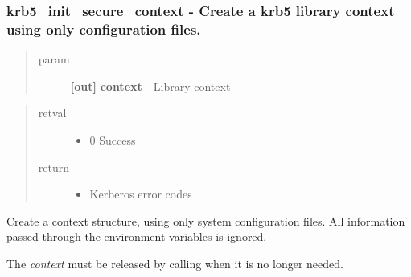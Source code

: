 \documentclass[letterpaper,10pt,english]{sphinxmanual}
\begin{document}
\subsubsection{krb5\_init\_secure\_context -  Create a krb5 library context using only configuration files.}
\label{appdev/refs/api/krb5_init_secure_context::doc}\label{appdev/refs/api/krb5_init_secure_context:krb5-init-secure-context-create-a-krb5-library-context-using-only-configuration-files}

\begin{fulllineitems}
\label{appdev/refs/api/krb5_init_secure_context:c.krb5_init_secure_context}
\end{fulllineitems}

\begin{quote}\begin{description}
\item[{param}] \leavevmode
\textbf{{[}out{]}} \textbf{context} - Library context

\end{description}\end{quote}
\begin{quote}\begin{description}
\item[{retval}] \leavevmode\begin{itemize}
\item {} 
0   Success

\end{itemize}

\item[{return}] \leavevmode\begin{itemize}
\item {} 
Kerberos error codes

\end{itemize}

\end{description}\end{quote}

Create a context structure, using only system configuration files. All information passed through the environment variables is ignored.

The \emph{context} must be released by calling {\hyperref[appdev/refs/api/krb5_free_context:c.krb5_free_context]{}} when it is no longer needed.
\end{document}
